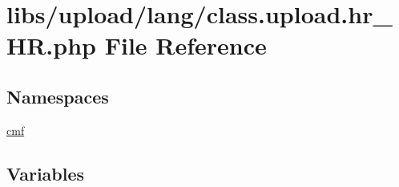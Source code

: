 \hypertarget{class_8upload_8hr___h_r_8php}{}\section{libs/upload/lang/class.upload.\+hr\+\_\+\+H\+R.\+php File Reference}
\label{class_8upload_8hr___h_r_8php}
\subsection*{Namespaces}
\begin{DoxyCompactItemize}
\item 
 \hyperlink{namespacecmf}{cmf}
\end{DoxyCompactItemize}
\subsection*{Variables}
